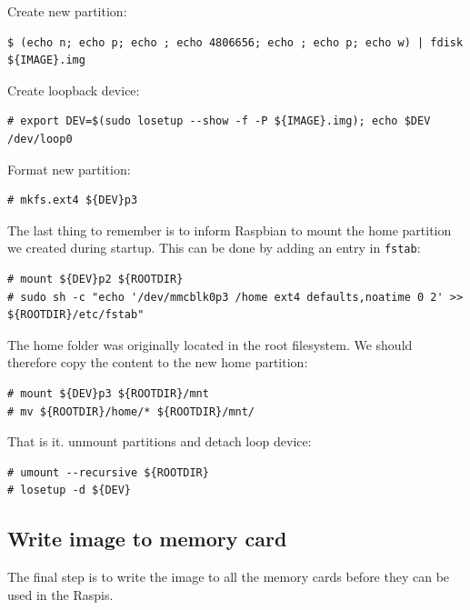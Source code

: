 Create new partition:

\begin{lstlisting}[]
$ (echo n; echo p; echo ; echo 4806656; echo ; echo p; echo w) | fdisk ${IMAGE}.img
\end{lstlisting}
\FloatBarrier
\vspace{-5mm}

Create loopback device: 
\begin{lstlisting}[]
# export DEV=$(sudo losetup --show -f -P ${IMAGE}.img); echo $DEV
/dev/loop0
\end{lstlisting}
\FloatBarrier
\vspace{-5mm}

Format new partition:
\begin{lstlisting}[]
# mkfs.ext4 ${DEV}p3
\end{lstlisting}
\FloatBarrier
\vspace{-5mm}

The last thing to remember is to inform Raspbian to mount the home partition
we created during startup. This can be done by adding an entry in \texttt{fstab}:
\begin{lstlisting}[]
# mount ${DEV}p2 ${ROOTDIR}
# sudo sh -c "echo '/dev/mmcblk0p3 /home ext4 defaults,noatime 0 2' >> ${ROOTDIR}/etc/fstab"
\end{lstlisting}
\FloatBarrier
\vspace{-5mm}

The home folder was originally located in the root filesystem. We should
therefore copy the content to the new home partition:
\begin{lstlisting}[]
# mount ${DEV}p3 ${ROOTDIR}/mnt
# mv ${ROOTDIR}/home/* ${ROOTDIR}/mnt/
\end{lstlisting}
\FloatBarrier
\vspace{-5mm}

That is it. unmount partitions and detach loop device:
\begin{lstlisting}[]
# umount --recursive ${ROOTDIR}
# losetup -d ${DEV}
\end{lstlisting}
\FloatBarrier
\vspace{-5mm}

\subsection{Write image to memory card}

The final step is to write the image to all the memory cards before they can
be used in the \ac{Raspi}s.


